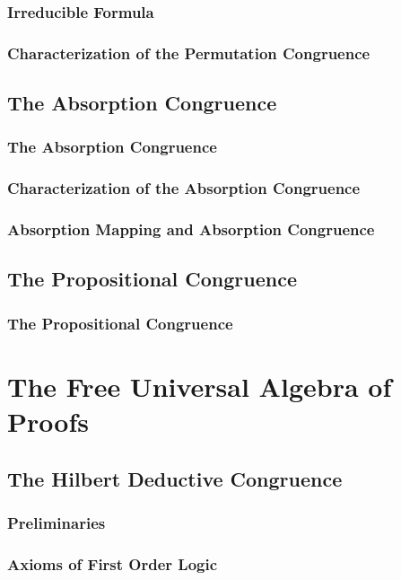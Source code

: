 \documentclass{report}
\begin{document}
    \subsection{Irreducible Formula}
    \subsection{Characterization of the Permutation Congruence}
\section{The Absorption Congruence}
    \subsection{The Absorption Congruence}
    \subsection{Characterization of the Absorption Congruence}
    \subsection{Absorption Mapping and Absorption Congruence}
\section{The Propositional Congruence}
    \subsection{The Propositional Congruence}
\chapter{The Free Universal Algebra of Proofs}
\section{The Hilbert Deductive Congruence}
    \subsection{Preliminaries}
    \subsection{Axioms of First Order Logic}
\end{document}
